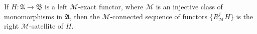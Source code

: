 If $H : \mathfrak{A} \to \mathfrak{B}$ is a left $\mathcal{M}$-exact functor, where $\mathcal{M}$ is an injective class of monomorphisms in $\mathfrak{A}$, then the $\mathcal{M}$-connected sequence of functors $\{R^j_{\mathcal{M}} H\}$ is the right $\mathcal{M}$-satellite of $H$.